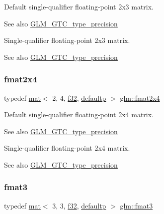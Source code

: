 Default single-\/qualifier floating-\/point 2x3 matrix. \begin{DoxySeeAlso}{See also}
\mbox{\hyperlink{group__gtc__type__precision}{G\+L\+M\+\_\+\+G\+T\+C\+\_\+type\+\_\+precision}}
\end{DoxySeeAlso}
Single-\/qualifier floating-\/point 2x3 matrix. \begin{DoxySeeAlso}{See also}
\mbox{\hyperlink{group__gtc__type__precision}{G\+L\+M\+\_\+\+G\+T\+C\+\_\+type\+\_\+precision}} 
\end{DoxySeeAlso}
\mbox{\label{group__gtc__type__precision_gabaf7537f5284456254b1da1cd6fd2b78}} 
\subsubsection{\texorpdfstring{fmat2x4}{fmat2x4}}
{\footnotesize\ttfamily typedef \mbox{\hyperlink{structglm_1_1mat}{mat}}$<$ 2, 4, \mbox{\hyperlink{group__gtc__type__precision_ga0ec999b57f5330d9021256e96038df04}{f32}}, \mbox{\hyperlink{namespaceglm_a36ed105b07c7746804d7fdc7cc90ff25a9d21ccd8b5a009ec7eb7677befc3bf51}{defaultp}} $>$ \mbox{\hyperlink{group__gtc__type__precision_gabaf7537f5284456254b1da1cd6fd2b78}{glm\+::fmat2x4}}}

Default single-\/qualifier floating-\/point 2x4 matrix. \begin{DoxySeeAlso}{See also}
\mbox{\hyperlink{group__gtc__type__precision}{G\+L\+M\+\_\+\+G\+T\+C\+\_\+type\+\_\+precision}}
\end{DoxySeeAlso}
Single-\/qualifier floating-\/point 2x4 matrix. \begin{DoxySeeAlso}{See also}
\mbox{\hyperlink{group__gtc__type__precision}{G\+L\+M\+\_\+\+G\+T\+C\+\_\+type\+\_\+precision}} 
\end{DoxySeeAlso}
\mbox{\label{group__gtc__type__precision_ga5d1e667b4d603704203af21ff6dbe4e5}} 
\subsubsection{\texorpdfstring{fmat3}{fmat3}}
{\footnotesize\ttfamily typedef \mbox{\hyperlink{structglm_1_1mat}{mat}}$<$ 3, 3, \mbox{\hyperlink{group__gtc__type__precision_ga0ec999b57f5330d9021256e96038df04}{f32}}, \mbox{\hyperlink{namespaceglm_a36ed105b07c7746804d7fdc7cc90ff25a9d21ccd8b5a009ec7eb7677befc3bf51}{defaultp}} $>$ \mbox{\hyperlink{group__gtc__type__precision_ga5d1e667b4d603704203af21ff6dbe4e5}{glm\+::fmat3}}}

